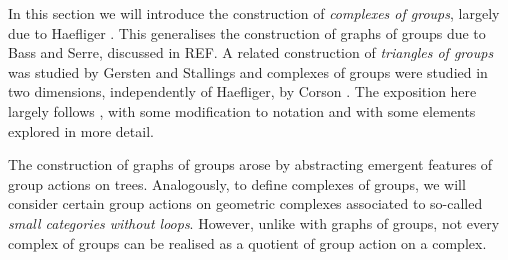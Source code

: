 In this section we will introduce the construction of \emph{complexes of groups}, largely due to Haefliger \cite{haefliger_complexes_1991}.
This generalises the construction of graphs of groups due to Bass and Serre, discussed in REF.
A related construction of \emph{triangles of groups} was studied by Gersten and Stallings \cite{stallings_nonpositively_1991} and complexes of groups were studied in two dimensions, independently of Haefliger, by Corson \cite{corson_complexes_1992}.
The exposition here largely follows \cite[Chapter 3.\textrm{\ensuremath{\calc}}]{BrHa11}, with some modification to notation and with some elements explored in more detail.

The construction of graphs of groups arose by abstracting emergent features of group actions on trees.
Analogously, to define complexes of groups, we will consider certain group actions on geometric complexes associated to so-called \emph{small categories without loops}.
However, unlike with graphs of groups, not every complex of groups can be realised as a quotient of group action on a complex.
